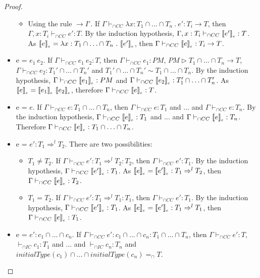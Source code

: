 \documentclass[a4paper]{article}
\begin{document}
\begin{proof}
\begin{itemize}
\begin{itemize}
        \item Using the rule ${\rightarrow} I'$.
        If $\Gamma \vdash_{\cap CC} \lambda x : T_1 \cap \ldots \cap T_n\ .\ e' : T_i \rightarrow T$, then $\Gamma, x : T_i \vdash_{\cap CC} e' : T$.
        By the induction hypothesis, $\Gamma, x : T_i \vdash_{\cap CC} \llbracket e' \rrbracket_{_e} : T$.
        As $\erasee{e} = \lambda x : T_1 \cap \ldots \cap T_n\ .\ \erasee{e'}$, then $\Gamma \vdash_{\cap CC} \llbracket e \rrbracket_{_e} : T_i \rightarrow T$.
    \end{itemize}
    \item e = $e_1\ e_2$.
    If $\Gamma \vdash_{\cap CC} e_1\ e_2 : T$, then $\Gamma \vdash_{\cap CC} e_1 : PM$, $PM \rhd T_1 \cap \ldots \cap T_n \rightarrow T$, $\Gamma \vdash_{\cap CC} e_2 : T_1' \cap \ldots \cap T_n'$ and $T_1' \cap \ldots \cap T_n' \sim T_1 \cap \ldots \cap T_n$.
    By the induction hypothesis, $\Gamma \vdash_{\cap CC} \llbracket e_1 \rrbracket_{_e} : PM$ and $\Gamma \vdash_{\cap CC} \llbracket e_2 \rrbracket_{_e} : T_1' \cap \ldots \cap T_n'$.
    As $\llbracket e \rrbracket_{_e} = \llbracket e_1 \rrbracket_{_e}\ \llbracket e_2 \rrbracket_{_e}$, therefore $\Gamma \vdash_{\cap CC} \llbracket e \rrbracket_{_e} : T$.
    \item e = $e$.
    If $\Gamma \vdash_{\cap CC} e : T_1 \cap \ldots \cap T_n$, then $\Gamma \vdash_{\cap CC} e : T_1$ and ... and $\Gamma \vdash_{\cap CC} e : T_n$.
    By the induction hypothesis, $\Gamma \vdash_{\cap CC} \llbracket e \rrbracket_{_e} : T_1$ and ... and $\Gamma \vdash_{\cap CC} \llbracket e \rrbracket_{_e} : T_n$.
    Therefore $\Gamma \vdash_{\cap CC} \llbracket e \rrbracket_{_e} : T_1 \cap \ldots \cap T_n$.
    \item e = $e' : T_1 \Rightarrow^l T_2$.
    There are two possibilities:
    \begin{itemize}
        \item $T_1 \neq T_2$.
        If $\Gamma \vdash_{\cap CC} e' : T_1 \Rightarrow^l T_2 : T_2$, then $\Gamma \vdash_{\cap CC} e' : T_1$.
        By the induction hypothesis, $\Gamma \vdash_{\cap CC} \llbracket e' \rrbracket_{_e} : T_1$.
        As $\llbracket e \rrbracket_{_e} = \llbracket e' \rrbracket_{_e} : T_1 \Rightarrow^l T_2$, then $\Gamma \vdash_{\cap CC} \llbracket e \rrbracket_{_e} : T_2$.
        \item $T_1 = T_2$.
        If $\Gamma \vdash_{\cap CC} e' : T_1 \Rightarrow^l T_1 : T_1$, then $\Gamma \vdash_{\cap CC} e' : T_1$.
        By the induction hypothesis, $\Gamma \vdash_{\cap CC} \llbracket e' \rrbracket_{_e} : T_1$.
        As $\llbracket e \rrbracket_{_e} = \llbracket e' \rrbracket_{_e} : T_1 \Rightarrow^l T_1$, then $\Gamma \vdash_{\cap CC} \llbracket e \rrbracket_{_e} : T_1$.
    \end{itemize}
    \item e = $e' : c_1 \cap \ldots \cap c_n$.
    If $\Gamma \vdash_{\cap CC} e' : c_1 \cap \ldots \cap c_n : T_1 \cap \ldots \cap T_n$, then $\Gamma \vdash_{\cap CC} e' : T$, $\vdash_{\cap IC} c_1 : T_1$ and ... and $\vdash_{\cap IC} c_n : T_n$ and $initialType(c_1) \cap \ldots \cap initialType(c_n) =_{\cap} T$.

\end{itemize}
\end{proof}
\end{document}
